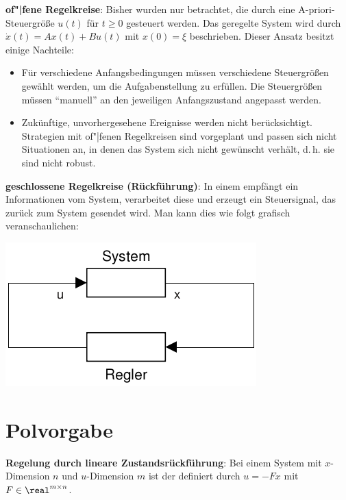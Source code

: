 \textbf{of"|fene Regelkreise}:
Bisher wurden nur  betrachtet,
die durch eine A-priori-Steuergröße $u(t)$ für $t \ge 0$ gesteuert werden.
Das geregelte System wird durch $\dot{x}(t) = Ax(t) + Bu(t)$ mit $x(0) = \xi$ beschrieben.
Dieser Ansatz besitzt einige Nachteile:
\begin{itemize}
    \item
    Für verschiedene Anfangsbedingungen müssen verschiedene Steuergrößen gewählt werden,
    um die Aufgabenstellung zu erfüllen.
    Die Steuergrößen müssen "`manuell"' an den jeweiligen Anfangszustand angepasst werden.

    \item
    Zukünftige, unvorhergesehene Ereignisse werden nicht berücksichtigt.
    Strategien mit of"|fenen Regelkreisen sind vorgeplant und passen sich nicht Situationen an,
    in denen das System sich nicht gewünscht verhält, d.\,h. sie sind nicht robust.
\end{itemize}

\linie

\textbf{geschlossene Regelkreise (Rückführung)}:
In einem  empfängt ein
 Informationen vom System,
verarbeitet diese und erzeugt ein Steuersignal, das zurück zum System gesendet wird.
Man kann dies wie folgt grafisch veranschaulichen:

\begin{center}
    \includegraphics[scale=\modelscale]{rueckkopplung}
\end{center}

\pagebreak

\section{%
    Polvorgabe%
}

\textbf{Regelung durch lineare Zustandsrückführung}:
Bei einem System mit $x$-Dimension $n$ und $u$-Dimension $m$ ist
der  definiert
durch $u = -Fx$ mit $F \in \real^{m \times n}$.

